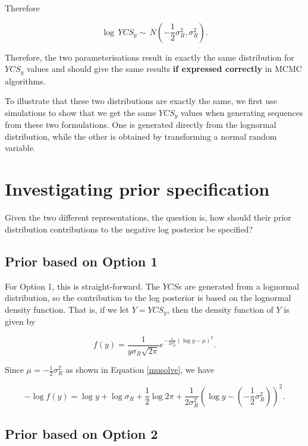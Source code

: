 \begin{appendices}
Therefore

\[\log\, YCS_y \sim \,N\left(-\frac{1}{2}\sigma^2_R, \sigma^2_R\right).\]

Therefore, the two parameterisations result in exactly the same distribution for \(YCS_y\) values and should give the same results \textbf{if expressed correctly} in MCMC algorithms.

To illustrate that these two distributions are exactly the same, we first use simulations to show that we get the same \(YCS_y\) values when generating sequences from these two formulations. One is generated directly from the lognormal distribution, while the other is obtained by transforming a normal random variable.

\section*{Investigating prior
	specification}\label{investigating-prior-specification}

Given the two different representations, the question is, how should their prior distribution contributions to the negative log posterior be specified?

\subsection*{Prior based on Option 1}\label{prior-based-on-option-1}

For Option 1, this is straight-forward. The \(YCS\)s are generated from a lognormal distribution, so the contribution to the log posterior is based on the lognormal density function. That is, if we let \(Y=YCS_y\), then the density function of \(Y\) is given by

\[f(y)= \frac{1}{y\sigma_R\sqrt{2\pi}}e^{-\frac{1}{2\sigma_R^2}(\log y -\mu)^2}.\]

Since \(\mu = -\frac{1}{2}\sigma^2_R\) as shown in Equation \ref{musolve}, we have

\begin{equation}
-\log f(y)= \log y + \log \sigma_R + \frac{1}{2}\log 2\pi + \frac{1}{2\sigma_R^2}\left(\log y - (-\frac{1}{2}\sigma^2_R)\right)^2.
\label{logfy}
\end{equation}

\subsection*{Prior based on Option 2}\label{prior-based-on-option-2}


\end{appendices}
